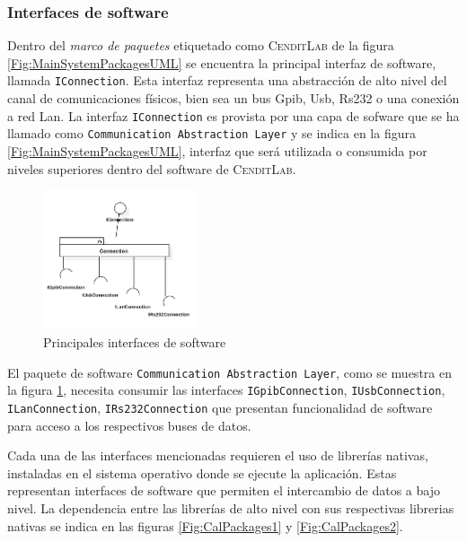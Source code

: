 \documentclass[paper=a4,oneside,fontsize=12pt]{article}
\newcommand{\AppName}{\textsc{CenditLab}\xspace}
\begin{document}
	\subsubsection{Interfaces de software}
	
	Dentro del \emph{marco de paquetes} etiquetado como \AppName de la figura \ref{Fig:MainSystemPackagesUML} se encuentra la principal interfaz de software, llamada \texttt{IConnection}. Esta interfaz representa una abstracción de alto nivel del canal de comunicaciones físicos, bien sea un bus Gpib, Usb, Rs232 o una conexión a red Lan. La interfaz \texttt{IConnection} es provista por una capa de sofware que se ha llamado como \texttt{Communication~Abstraction~Layer} y se indica en la figura \ref{Fig:MainSystemPackagesUML}, interfaz que será utilizada o consumida por niveles superiores dentro del software de \AppName.
	
	\begin{figure}[H]
		\centering
		\includegraphics[width=0.4\textwidth]{Imagenes/CommunicationAbstractionLayerPackages1.pdf}
		\caption{Principales interfaces de software}
		\label{Fig:CalPackagesMain}
	\end{figure}
	
	El paquete de software \texttt{Communication~Abstraction~Layer}, como se muestra en la figura \ref{Fig:CalPackagesMain}, necesita consumir las interfaces \texttt{IGpibConnection}, \texttt{IUsbConnection}, \texttt{ILanConnection}, \texttt{IRs232Connection} que presentan funcionalidad de software para acceso a los respectivos buses de datos. 
	
	Cada una de las interfaces mencionadas requieren el uso de librerías nativas, instaladas en el sistema operativo donde se ejecute la aplicación. Estas representan interfaces de software que permiten el intercambio de datos a bajo nivel. La dependencia entre las librerías de alto nivel con sus respectivas librerias nativas se indica en las figuras \ref{Fig:CalPackages1} y \ref{Fig:CalPackages2}.
\end{document}
